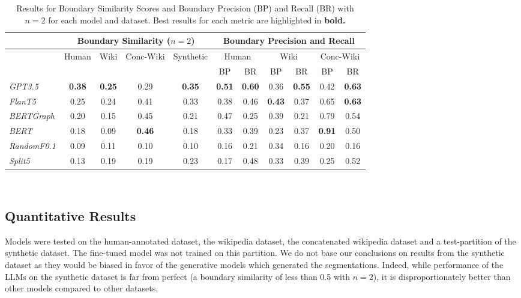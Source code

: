 \begin{table*}[ht]
    \centering
    \begin{tabular}{@{}lcccc@{\hspace{2em}}ccccc@{\hspace{0.2em}}c@{}}
    \toprule
    & \multicolumn{4}{c}{Boundary Similarity ($n=2$)} & \multicolumn{6}{c}{Boundary Precision and Recall} \\ 
    \midrule
    & Human & Wiki & Conc-Wiki & Synthetic & \multicolumn{2}{c}{Human} & \multicolumn{2}{c}{Wiki} & \multicolumn{2}{c}{Conc-Wiki} \\ 
    &  &  &  &  & BP & BR & BP & BR & BP & BR \\
    \midrule
    \it GPT3.5  & \bf 0.38 & \bf 0.25 & 0.29 & \bf 0.35 & \bf 0.51 & \bf 0.60 & 0.36 & \bf 0.55 & 0.42 & \bf 0.63 \\ 
    \it FlanT5  & 0.25 & 0.24 & 0.41 & 0.33 & 0.38 & 0.46 & \bf 0.43 & 0.37 & 0.65 & \bf 0.63 \\ 
    \midrule
    \it BERTGraph   & 0.20 & 0.15 & 0.45 & 0.21 & 0.47 & 0.25 & 0.39 & 0.21 & 0.79 & 0.54 \\ 
    \it BERT    & 0.18 & 0.09 & \bf 0.46 & 0.18 & 0.33 & 0.39 & 0.23 & 0.37 & \bf 0.91 & 0.50 \\ 
    \it RandomF0.1 & 0.09 & 0.11 & 0.10 & 0.10 & 0.16 & 0.21 & 0.34 & 0.16 & 0.20 & 0.16 \\ 
    \it Split5  & 0.13 & 0.19 & 0.19 & 0.23 & 0.17 & 0.48 & 0.33 & 0.39 & 0.25 & 0.52 \\ 
    \bottomrule
    \end{tabular}
    \caption{Results for Boundary Similarity Scores and Boundary Precision (BP) and Recall (BR) with $n=2$ for each model and dataset. Best results for each metric are highlighted in \bf bold.}~\label{tab:combined_results}
\end{table*}


\subsection{Quantitative Results}

Models were tested on the human-annotated dataset, the wikipedia dataset, the concatenated wikipedia dataset and a test-partition of the synthetic dataset. The fine-tuned model was not trained on this partition. We do not base our conclusions on results from the synthetic dataset as they would be biased in favor of the generative models which generated the segmentations. Indeed, while performance of the LLMs on the synthetic dataset is far from perfect (a boundary similarity of less than 0.5 with $n=2$), it is disproportionately better than other models compared to other datasets.

